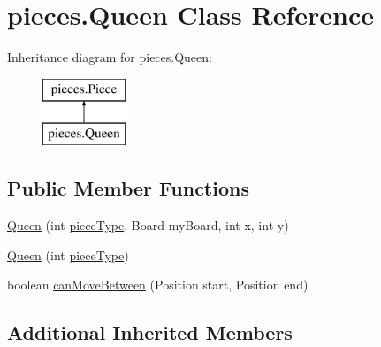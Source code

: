 \hypertarget{classpieces_1_1_queen}{\section{pieces.\-Queen Class Reference}
\label{classpieces_1_1_queen}
}
Inheritance diagram for pieces.\-Queen\-:\begin{figure}[H]
\begin{center}
\leavevmode
\includegraphics[height=2.000000cm]{classpieces_1_1_queen}
\end{center}
\end{figure}
\subsection*{Public Member Functions}
\begin{DoxyCompactItemize}
\item 
\hyperlink{classpieces_1_1_queen_a6165d27ad45f5a4b3819ace9c3fcecae}{Queen} (int \hyperlink{classpieces_1_1_piece_ae40d6201d0aed36f369dd9d8f55892e3}{piece\-Type}, Board my\-Board, int x, int y)
\item 
\hyperlink{classpieces_1_1_queen_a62084d8fc37c5ba7a23f6c174ab4b800}{Queen} (int \hyperlink{classpieces_1_1_piece_ae40d6201d0aed36f369dd9d8f55892e3}{piece\-Type})
\item 
boolean \hyperlink{classpieces_1_1_queen_a665a853e2c80719c12cbaf0c481c908a}{can\-Move\-Between} (Position start, Position end)
\end{DoxyCompactItemize}
\subsection*{Additional Inherited Members}


